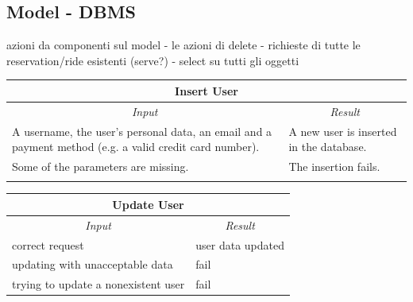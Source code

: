\documentclass[english]{article}
\begin{document}


\subsection{Model - DBMS}
azioni da componenti sul model
- le azioni di delete
- richieste di tutte le reservation/ride esistenti (serve?)
- select su tutti gli oggetti


\begin{center}

	\begin{tabular}{ | p{6cm} | p{6cm} | }
		\hline 


		\hline

		\multicolumn{2}{|c|}{\textbf{Insert User}} \\
		\hline
		\multicolumn{1}{|c|}{\textit{Input}} & \multicolumn{1}{c|}{\textit{Result}} \\
		\hline
		A username, the user's personal data, an email and a payment method (e.g. a valid credit card number). & A new user is inserted in the database. \\
		\hline
		Some of the parameters are missing. & The insertion fails. \\
		\hline
		& \\
		\hline
	\end{tabular}
\end{center}
\begin{center}

	\begin{tabular}{ | p{6cm} | p{6cm} | }
		\hline 


		\hline

		\multicolumn{2}{|c|}{\textbf{Update User}} \\
		\hline
		\multicolumn{1}{|c|}{\textit{Input}} & \multicolumn{1}{c|}{\textit{Result}} \\
		\hline
		correct request & user data updated \\
		\hline
		updating with unacceptable data & fail \\
		\hline
		trying to update a nonexistent user & fail \\
		\hline
	\end{tabular}
\end{center}
\end{document}
